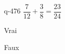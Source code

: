 \begin{truefalse}{q-476}
$\dfrac{7}{12} + \dfrac{3}{8}  = \dfrac{23}{24}$
\item* Vrai
\item Faux
\end{truefalse}

